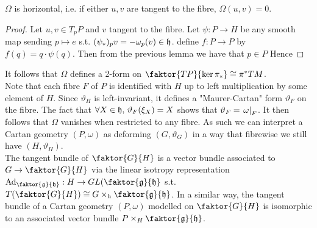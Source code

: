 \documentclass{article}
\begin{document}
\begin{corollary}
$\Omega$ is horizontal, i.e. if either $u,v$ are tangent to the fibre, $\Omega(u,v) = 0$.
\end{corollary}
\begin{proof}
Let $u,v \in T_pP$ and $v$ tangent to the fibre. Let $\psi : P \to H$ be any smooth map sending  $p \mapsto e$ s.t. $(\psi_\ast)_p v = -\omega_p(v) \in \mathfrak{h}$. define $f: P \to P$ by $f(q) = q \cdot \psi(q)$. Then from the previous lemma we have that $p \in P$ 
Hence 
\end{proof}
It follows that $\Omega$ defines a 2-form on $\faktor{TP}{\ker \pi_\ast} \cong \pi^\ast  TM$. \\
Note that each fibre $F$ of $P$ is identified with $H$ up to left multiplication by some element of $H$. Since $\vartheta_H$ is left-invariant, it defines a "Maurer-Cartan" form $\vartheta_F$ on the fibre. The fact that $\forall X \in \mathfrak{h}, \, \vartheta_F(\xi_X) = X$ shows that $\vartheta_F = \left. \omega \right\rvert_{F}$. It then follows that $\Omega$ vanishes when restricted to any fibre. As such we can interpret a Cartan geometry $(P,\omega)$ as deforming $(G,\vartheta_G)$ in a way that fibrewise we still have $(H,\vartheta_H)$. \\
The tangent bundle of $\faktor{G}{H}$ is a vector bundle associated to $G \to \faktor{G}{H}$ via the linear isotropy representation $\Ad_{\faktor{\mf{g}}{\mf{h}}} : H \to GL(\faktor{\mf{g}}{\mf{h}}$ s.t. $T(\faktor{G}{H}) \cong G \times_h \faktor{\mf{g}}{\mf{h}}$. In a similar way, the tangent bundle of a Cartan geometry $(P,\omega)$ modelled on $\faktor{G}{H}$ is isomorphic to an associated vector bundle $P \times_H \faktor{\mf{g}}{\mf{h}}$. 
\end{document}
